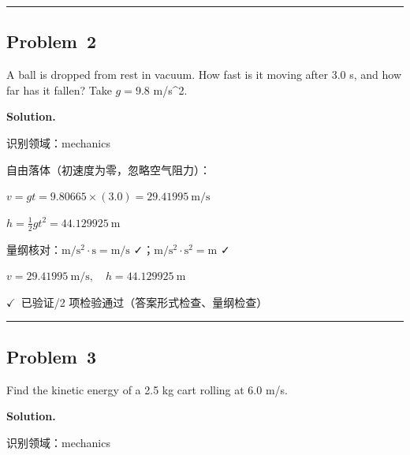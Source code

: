 \documentclass[12pt, a4paper]{article}
\newcommand{\problem}[1]{\subsection*{Problem~#1}}
\newcommand{\solution}{%
  \par\noindent
  {\color{solutiongreen}\bfseries Solution.}\par
}
\newcommand{\verifyok}{\textcolor{solutiongreen}{\ensuremath{\checkmark}\ 已验证}}
\begin{document}
\vspace{0.8em}\hrule\vspace{0.8em}

\problem{2}

\begin{stepbox}
A ball is dropped from rest in vacuum. How fast is it moving after 3.0 s,
and how far has it fallen? Take $g = 9.8$ m/s\textasciicircum{}2.
\end{stepbox}

\solution

\begin{stepbox}
识别领域：mechanics
\end{stepbox}

\begin{stepbox}
自由落体（初速度为零，忽略空气阻力）：
\end{stepbox}

\begin{stepbox}
$v = gt = 9.80665\times(3.0) = 29.41995\ \mathrm{m/s}$
\end{stepbox}

\begin{stepbox}
$h = \frac{1}{2}gt^2 = 44.129925\ \mathrm{m}$
\end{stepbox}

\begin{stepbox}
量纲核对：$\mathrm{m/s^2}\cdot\mathrm{s}=\mathrm{m/s}$ ✓；$\mathrm{m/s^2}\cdot\mathrm{s^2}=\mathrm{m}$ ✓
\end{stepbox}

\begin{center}
$\boxed{v = 29.41995\ \mathrm{m/s},\quad h = 44.129925\ \mathrm{m}}$
\end{center}

\begin{verifybox}\small \verifyok{}/2 项检验通过（答案形式检查、量纲检查） \end{verifybox}

\vspace{0.8em}\hrule\vspace{0.8em}

\problem{3}

\begin{stepbox}
Find the kinetic energy of a 2.5 kg cart rolling at 6.0 m/s.
\end{stepbox}

\solution

\begin{stepbox}
识别领域：mechanics
\end{stepbox}
\end{document}
